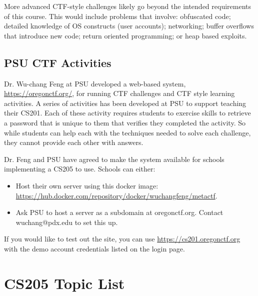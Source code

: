 \documentclass[12pt,letterpaper]{article}
\begin{document}
	More advanced CTF-style challenges likely go beyond the intended requirements of this course. This would include problems that involve: obfuscated code; detailed knowledge of OS constructs (user accounts); networking; buffer overflows that introduce new code; return oriented programming; or heap based exploits.

	\subsection*{PSU CTF Activities}

	Dr. Wu-chang Feng at PSU developed a web-based system, \url{https://oregonctf.org/}, for running CTF challenges and CTF style learning activities. A series of activities has been developed at PSU to support teaching their CS201. Each of these activity requires students to exercise skills to retrieve a password that is unique to them that verifies they completed the activity. So while students can help each with the techniques needed to solve each challenge, they cannot provide each other with answers.
	
	Dr. Feng and PSU have agreed to make the system available for schools implementing a CS205 to use. Schools can either:
	
	\begin{itemize}
		\item Host their own server using this docker image: \url{https://hub.docker.com/repository/docker/wuchangfeng/metactf}.
		\item Ask PSU to host a server as a subdomain at oregonctf.org. Contact wuchang@pdx.edu to set this up.
	\end{itemize}

	If you would like to test out the site, you can use \url{https://cs201.oregonctf.org} with the demo account credentials listed on the login page.


	\section{CS205 Topic List}

		
\end{document}
